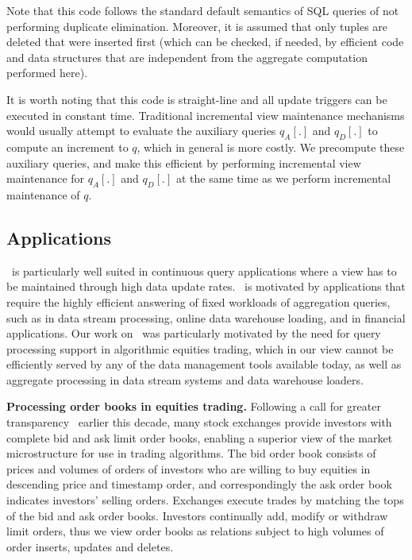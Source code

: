 \begin{example}
Note that this code follows the standard default semantics of SQL queries of
not performing duplicate elimination. Moreover, it is assumed that
only tuples are deleted that were inserted first (which can be checked,
if needed, by efficient code and data structures that are independent from
the aggregate computation performed here).

It is worth noting that this code is straight-line and all update
triggers can be executed in constant time. Traditional incremental view
maintenance mechanisms would usually attempt to evaluate the auxiliary queries
$q_A[.]$ and $q_D[.]$ to compute an increment to $q$,
which in general is more costly.
We precompute these auxiliary queries, and make this efficient by performing
incremental view maintenance for $q_A[.]$ and $q_D[.]$ at the same time as
we perform incremental maintenance of $q$.
\end{example}



\subsection{Applications}


\compiler\ is particularly well suited in continuous query applications
where a view has to be maintained through high data update rates. \compiler\ is
motivated  by  applications  that  require  the  highly efficient answering of
fixed workloads of aggregation queries, such as in  data stream  processing,
online data  warehouse  loading, and  in financial applications. Our work on
\compiler\ was particularly motivated by the need for query processing support in
algorithmic equities trading, which in our view cannot be efficiently served by
any of the data management tools available today, as well as aggregate processing
in data stream systems and data warehouse loaders.


\medskip


\textbf{Processing order books in equities trading.}
Following a call for greater transparency~\cite{sec-orderbook:00} earlier this
decade, many stock exchanges provide investors with complete bid and ask limit
order books, enabling a superior view of the market microstructure for use in
trading algorithms. The bid order book consists of prices and volumes of orders
of investors who are willing to buy equities in descending price and timestamp
order, and correspondingly the ask order book indicates investors' selling
orders. Exchanges execute trades by matching the tops of the bid and ask order
books. Investors continually add, modify or withdraw limit orders, thus we view
order books as relations subject to high volumes of order inserts, updates and
deletes.

